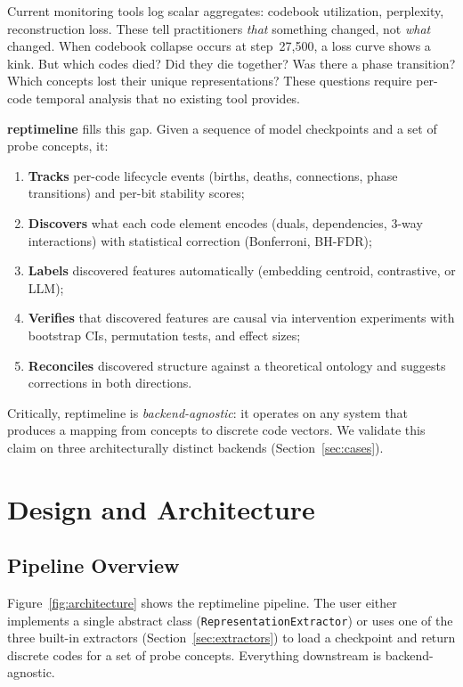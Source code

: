 \documentclass[11pt]{article}
\begin{document}
Current monitoring tools log scalar aggregates: codebook utilization, perplexity, reconstruction loss. These tell practitioners \emph{that} something changed, not \emph{what} changed. When codebook collapse occurs at step~27{,}500, a loss curve shows a kink. But which codes died? Did they die together? Was there a phase transition? Which concepts lost their unique representations? These questions require per-code temporal analysis that no existing tool provides.

\textbf{reptimeline} fills this gap. Given a sequence of model checkpoints and a set of probe concepts, it:
\begin{enumerate}[nosep]
    \item \textbf{Tracks} per-code lifecycle events (births, deaths, connections, phase transitions) and per-bit stability scores;
    \item \textbf{Discovers} what each code element encodes (duals, dependencies, 3-way interactions) with statistical correction (Bonferroni, BH-FDR);
    \item \textbf{Labels} discovered features automatically (embedding centroid, contrastive, or LLM);
    \item \textbf{Verifies} that discovered features are causal via intervention experiments with bootstrap CIs, permutation tests, and effect sizes;
    \item \textbf{Reconciles} discovered structure against a theoretical ontology and suggests corrections in both directions.
\end{enumerate}

Critically, reptimeline is \emph{backend-agnostic}: it operates on any system that produces a mapping from concepts to discrete code vectors. We validate this claim on three architecturally distinct backends (Section~\ref{sec:cases}).


\section{Design and Architecture}
\label{sec:design}

\subsection{Pipeline Overview}

Figure~\ref{fig:architecture} shows the reptimeline pipeline. The user either implements a single abstract class (\texttt{RepresentationExtractor}) or uses one of the three built-in extractors (Section~\ref{sec:extractors}) to load a checkpoint and return discrete codes for a set of probe concepts. Everything downstream is backend-agnostic.
\end{document}
